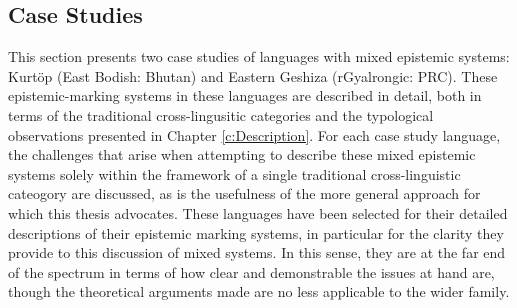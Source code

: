 \subsection{Case Studies}\label{ss:Discussion:MixedCases}
This section presents two case studies of languages with mixed epistemic systems: Kurtöp (East Bodish: Bhutan) and Eastern Geshiza (rGyalrongic: PRC). These epistemic-marking systems in these languages are described in detail, both in terms of the traditional cross-lingusitic categories and the typological observations presented in Chapter \ref{c:Description}. For each case study language, the challenges that arise when attempting to describe these mixed epistemic systems solely within the framework of a single traditional cross-linguistic cateogory are discussed, as is the usefulness of the more general approach for which this thesis advocates. These languages have been selected for their detailed descriptions of their epistemic marking systems, in particular for the clarity they provide to this discussion of mixed systems. In this sense, they are at the far end of the spectrum in terms of how clear and demonstrable the issues at hand are, though the theoretical arguments made are no less applicable to the wider family.
